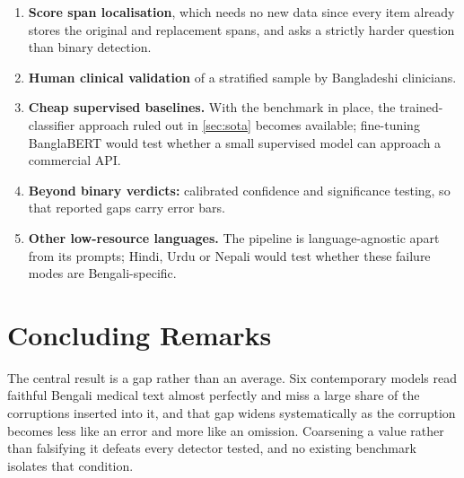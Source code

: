 \documentclass{iutbscthesis}
\begin{document}
\begin{enumerate}
    \item \textbf{Score span localisation}, which needs no new data since every item already stores the original and replacement spans, and asks a strictly harder question than binary detection.
    \item \textbf{Human clinical validation} of a stratified sample by Bangladeshi clinicians.
    \item \textbf{Cheap supervised baselines.} With the benchmark in place, the trained-classifier approach ruled out in \autoref{sec:sota} becomes available; fine-tuning BanglaBERT \parencite{bhattacharjee2022banglabert} would test whether a small supervised model can approach a commercial API.
    \item \textbf{Beyond binary verdicts:} calibrated confidence and significance testing, so that reported gaps carry error bars.
    \item \textbf{Other low-resource languages.} The pipeline is language-agnostic apart from its prompts; Hindi, Urdu or Nepali would test whether these failure modes are Bengali-specific.
\end{enumerate}

\section{Concluding Remarks}

The central result is a gap rather than an average. Six contemporary models read faithful Bengali medical text almost perfectly and miss a large share of the corruptions inserted into it, and that gap widens systematically as the corruption becomes less like an error and more like an omission. Coarsening a value rather than falsifying it defeats every detector tested, and no existing benchmark isolates that condition.


\printbib
\end{document}
